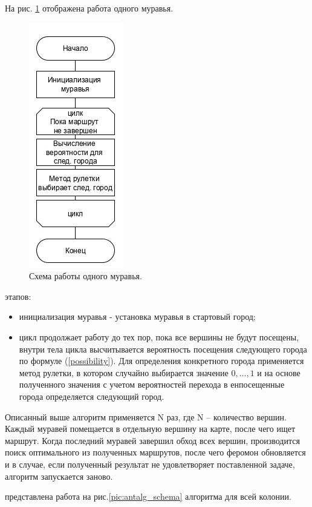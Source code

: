 \documentclass[a4paper,12pt]{article}
\begin{document}
			 На рис. \ref{pic:ant_schema} отображена работа одного муравья.
			 \begin{figure}[H]	
			 	{
			 		\centering
			 		\includegraphics[scale=0.75]{ant.jpg}
			 		\caption{Схема работы одного муравья.}
			 		\label{pic:ant_schema}
			 	}
			 \end{figure}
		 
		  этапов: 
		 \begin{itemize}
		 	\item инициализация муравья - установка муравья в стартовый город;
		 	\item цикл продолжает работу до тех пор, пока все вершины не будут посещены, внутри тела цикла высчитывается вероятность посещения следующего города по формуле (\ref{possibility}). Для определения конкретного города применяется метод рулетки, в котором случайно выбирается значение $ 0, \dots , 1 $ и на основе полученного значения с учетом вероятностей перехода в енпосещенные города определяется следующий город.
		 \end{itemize}
	\newpage
			Описанный выше алгоритм применяется N раз, где N -- количество вершин. Каждый муравей помещается в отдельную вершину на карте, после чего ищет маршрут. Когда последний муравей завершил обход всех вершин, производится поиск оптимального из полученных маршрутов, после чего феромон обновляется и в случае, если полученный результат не удовлетворяет поставленной задаче, алгоритм запускается заново. 
		

			 представлена работа на рис.\ref{pic:antalg_schema} алгоритма для всей колонии. 
			
\end{document}
